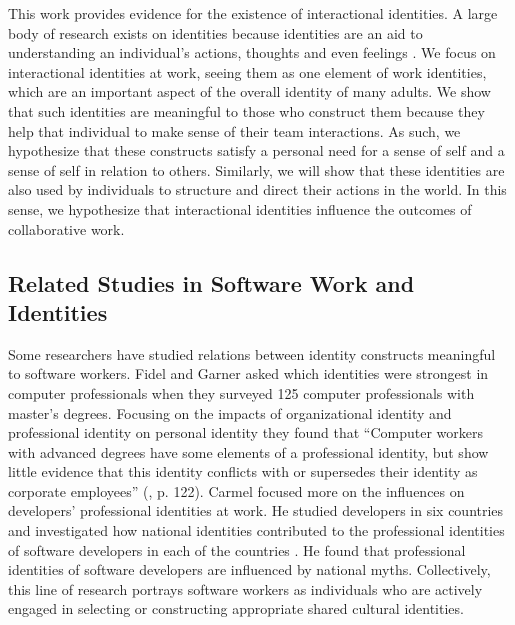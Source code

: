 \documentclass{chi2009}
\begin{document}
This work provides evidence for the existence of interactional identities.  A large body of research exists on identities because identities are an aid to understanding an individual's actions, thoughts and even feelings \cite{AshrothandKreiner1999}.  We focus on interactional identities at work, seeing them as one element of work identities, which are an important aspect of the overall identity of many adults. We show that such identities are meaningful to those who construct them because they help that individual to make sense of their team interactions.  As such, we hypothesize that these constructs satisfy a personal need for a sense of self and a sense of self in relation to others.  Similarly, we will show that these identities are also used by individuals to structure and direct their actions in the world.  In this sense, we hypothesize that interactional identities influence the outcomes of collaborative work. 

\subsection{Related Studies in Software Work and Identities}
Some researchers have studied relations between identity constructs meaningful to software workers. Fidel and Garner asked which identities were strongest in computer professionals when they surveyed 125 computer professionals with master's degrees.  Focusing on the impacts of organizational identity and professional identity on personal identity they found that ``Computer workers with advanced degrees have some elements of a professional identity, but show little evidence that this identity conflicts with or supersedes their identity as corporate employees'' (\cite{FidelandGarner1990b}, p. 122). Carmel focused more on the influences on developers' professional identities at work.  He studied developers in six countries and investigated how national identities contributed to the professional identities of software developers in each of the countries \cite{Carmel2006}.  He found that professional identities of software developers are influenced by national myths.  Collectively, this line of research portrays software workers as individuals who are actively engaged in selecting or constructing appropriate shared cultural identities. 
\end{document}
